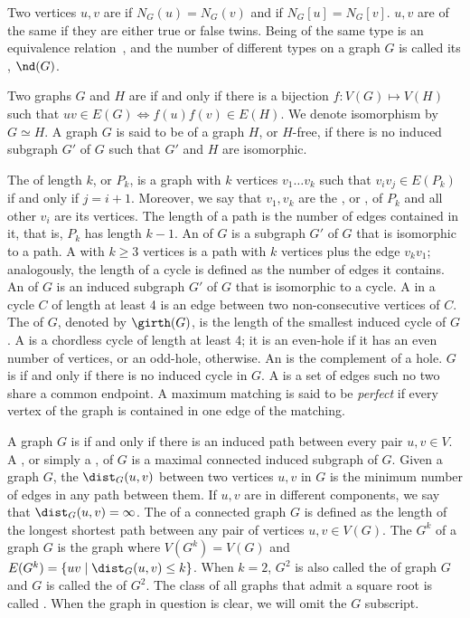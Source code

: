 Two vertices $u,v$ are  if $N_G(u) = N_G(v)$ and  if $N_G[u] = N_G[v]$. $u,v$ are of the same  if they are either true or false twins.
Being of the same type is an equivalence relation~\citep{neighbourhood_diversity}, and the number of different types on a graph $G$ is called its , $\nd(G)$.

Two graphs $G$ and $H$ are  if and only if there is a bijection $f: V(G) \mapsto V(H)$ such that $uv \in E(G) \Leftrightarrow f(u)f(v) \in E(H)$.
We denote isomorphism by $G \simeq H$.
A graph $G$ is said to be  of a graph $H$, or $H$-free, if there is no induced subgraph $G'$ of $G$ such that $G'$ and $H$ are isomorphic.

The  of length $k$, or $P_k$, is a graph with $k$ vertices $v_1 \dots v_k$ such that $v_iv_j \in E(P_k)$ if and only if $j = i+1$. Moreover, we say that $v_1, v_k$ are the , or , of $P_k$ and all other $v_i$ are its  vertices.
The length of a path is the number of edges contained in it, that is, $P_k$ has length $k-1$.
An  of $G$ is a subgraph $G'$ of $G$ that is isomorphic to a path.
A  with  $k \geq 3$ vertices is a path with $k$ vertices plus the edge $v_kv_1$; analogously, the length of a cycle is defined as the number of edges it contains.
An  of $G$ is an induced subgraph $G'$ of $G$ that is isomorphic to a cycle.
A  in a cycle $C$ of length at least 4 is an edge between two non-consecutive vertices of $C$.
The  of $G$, denoted by $\girth(G)$, is the length of the smallest induced cycle of $G$.
A  is a chordless cycle of length at least 4; it is an even-hole if it has an even number of vertices, or an odd-hole, otherwise. An  is the complement of a hole.
$G$ is  if and only if there is no induced cycle in $G$.
A  is a set of edges such no two share a common endpoint.
A maximum matching is said to be \textit{perfect} if every vertex of the graph is contained in one edge of the matching.

A graph $G$ is  if and only if there is an induced path between every pair $u,v \in V$.
A , or simply a , of $G$ is a maximal connected induced subgraph of $G$.
Given a graph $G$, the  $\dist_G(u,v)$ between two vertices $u,v$ in $G$ is the minimum number of edges in any path between them.
If $u,v$ are in different components, we say that $\dist_G(u,v) = \infty$.
The  of a connected graph $G$ is defined as the length of the longest shortest path between any pair of vertices $u,v \in V(G)$.
The  $G^k$ of a graph $G$ is the graph where $V(G^k) = V(G)$ and $E(G^k) = \{uv \mid \dist_G(u,v) \leq k\}$.
When $k = 2$, $G^2$ is also called the  of graph $G$ and $G$ is called the  of $G^2$.
The class of all graphs that admit a square root is called .
When the graph in question is clear, we will omit the $G$ subscript.

